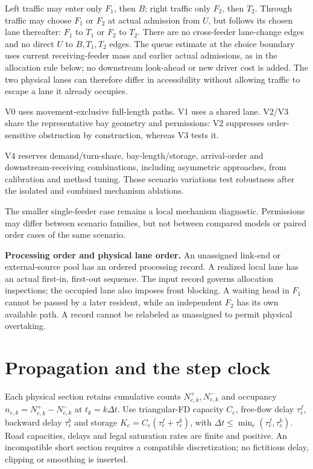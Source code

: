 \documentclass[10pt,a4paper]{article}
\begin{document}
Left traffic may enter only $F_1$, then $B$; right traffic only $F_2$,
then $T_2$. Through traffic may choose $F_1$ or $F_2$ at actual admission
from $U$, but follows its chosen lane thereafter: $F_1$ to $T_1$ or
$F_2$ to $T_2$. There are no cross-feeder lane-change edges and no direct
$U$ to $B,T_1,T_2$ edges. The queue estimate at the choice boundary uses
current receiving-feeder mass and earlier actual admissions, as in the
allocation rule below; no downstream look-ahead or new driver cost is added.
The two physical lanes can therefore differ in accessibility without
allowing traffic to escape a lane it already occupies.

V0 uses movement-exclusive full-length paths. V1 uses a shared lane.
V2/V3 share the representative bay geometry and permissions: V2 suppresses
order-sensitive obstruction by construction, whereas V3 tests it.

V4 reserves demand/turn-share, bay-length/storage, arrival-order and
downstream-receiving combinations, including asymmetric approaches,
from calibration and method tuning. Those scenario variations test
robustness after the isolated and combined mechanism ablations.
\par The smaller single-feeder
case remains a local mechanism diagnostic. Permissions may differ
between scenario families, but not between compared models or paired
order cases of the same scenario.

\textbf{Processing order and physical lane order.}
An unassigned link-end or external-source pool has an ordered processing
record. A realized local lane has an actual first-in, first-out sequence.
The input record governs allocation inspections; the occupied lane also
imposes front blocking. A waiting head in $F_1$ cannot be passed by a
later resident, while an independent $F_2$ has its own available path.
A record cannot be relabeled as unassigned to permit physical overtaking.

\section{Propagation and the step clock}

Each physical section retains cumulative counts $N^+_{e,k},N^-_{e,k}$
and occupancy $n_{e,k}=N^+_{e,k}-N^-_{e,k}$ at $t_k=k\Delta t$.
Use triangular-FD capacity $C_e$, free-flow delay $\tau^f_e$, backward
delay $\tau^b_e$ and storage $K_e=C_e(\tau^f_e+\tau^b_e)$, with
$\Delta t\leq\min_e(\tau^f_e,\tau^b_e)$.
Road capacities, delays and legal saturation rates are finite and positive.
An incompatible short section requires a compatible discretization;
no fictitious delay, clipping or smoothing is inserted.
\end{document}
